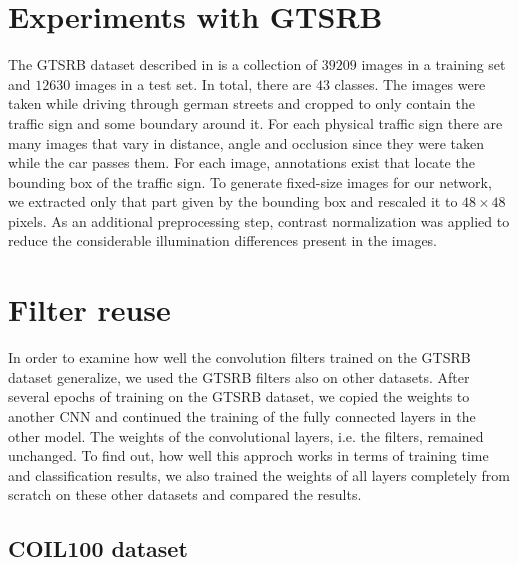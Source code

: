 \documentclass[11pt, a4paper]{article}
\begin{document}
\section{Experiments with GTSRB}
The GTSRB dataset described in \cite{gtsrb} is a collection of $39209$ images in a training set and $12630$ images in a test set. In total, there are $43$ classes. The images were taken while driving through german streets and cropped to only contain the traffic sign and some boundary around it. For each physical traffic sign there are many images that vary in distance, angle and occlusion since they were taken while the car passes them. For each image, annotations exist that locate the bounding box of the traffic sign. To generate fixed-size images for our network, we extracted only that part given by the bounding box and rescaled it to $48\times48$ pixels. As an additional preprocessing step, contrast normalization was applied to reduce the considerable illumination differences present in the images.

\section{Filter reuse}

In order to examine how well the convolution filters trained on the GTSRB dataset generalize, we used the GTSRB filters also on other datasets. After several epochs of training on the GTSRB dataset, we copied the weights to another CNN and continued the training of the fully connected layers in the other model. The weights of the convolutional layers, i.e. the filters, remained unchanged. To find out, how well this approch works in terms of training time and classification results, we also trained the weights of all layers completely from scratch on these other datasets and compared the results.

\subsection{COIL100 dataset}
\end{document}
